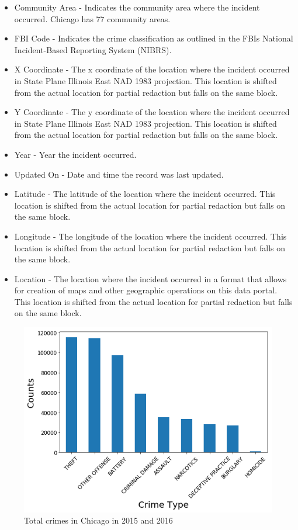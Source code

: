 \documentclass[12pt]{article}
\begin{document}
\begin{itemize}
\item Community Area - Indicates the community area where the incident occurred. Chicago has 77 community areas.
\item FBI Code - Indicates the crime classification as outlined in the FBIs National Incident-Based Reporting System (NIBRS).
\item X Coordinate - The x coordinate of the location where the incident occurred in State Plane Illinois East NAD 1983 projection. This location is shifted from the actual location for partial redaction but falls on the same block.
\item Y Coordinate - The y coordinate of the location where the incident occurred in State Plane Illinois East NAD 1983 projection. This location is shifted from the actual location for partial redaction but falls on the same block.
\item Year - Year the incident occurred.
\item Updated On - Date and time the record was last updated.
\item Latitude - The latitude of the location where the incident occurred. This location is shifted from the actual location for partial redaction but falls on the same block.
\item Longitude - The longitude of the location where the incident occurred. This location is shifted from the actual location for partial redaction but falls on the same block.
\item Location - The location where the incident occurred in a format that allows for creation of maps and other geographic operations on this data portal. This location is shifted from the actual location for partial redaction but falls on the same block.
\end{itemize}

\begin{figure}[ht]
\includegraphics[scale=0.5]{figure/total_crime.png}
\centering
\caption{Total crimes in Chicago in 2015 and 2016}
\label{fig:count}
\end{figure}
  
\end{document}

